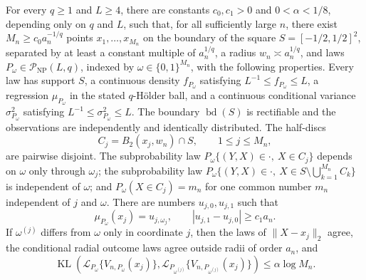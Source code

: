 For every \(q\geq1\) and \(L\geq4\), there are constants \(c_0,c_1>0\) and \(0<\alpha<1/8\), depending only on \(q\) and \(L\), such that, for all sufficiently large \(n\), there exist \(M_n\geq c_0a_n^{-1/q}\) points \(x_1,\ldots,x_{M_n}\) on the boundary of the square \(S=[-1/2,1/2]^2\), separated by at least a constant multiple of \(a_n^{1/q}\), a radius \(w_n\asymp a_n^{1/q}\), and laws \(P_\omega\in\mathcal P_{\mathrm{NP}}(L,q)\), indexed by \(\omega\in\{0,1\}^{M_n}\), with the following properties.  Every law has support \(S\), a continuous density \(f_{P_\omega}\) satisfying \(L^{-1}\leq f_{P_\omega}\leq L\), a regression \(\mu_{P_\omega}\) in the stated \(q\)-H\"older ball, and a continuous conditional variance \(\sigma^2_{P_\omega}\) satisfying \(L^{-1}\leq\sigma^2_{P_\omega}\leq L\).  The boundary \(\operatorname{bd}(S)\) is rectifiable and the observations are independently and identically distributed.  The half-discs
\[
 C_j=B_2(x_j,w_n)\cap S,\qquad 1\leq j\leq M_n,
\]
are pairwise disjoint.  The subprobability law \(P_\omega\{(Y,X)\in\cdot,\ X\in C_j\}\) depends on \(\omega\) only through \(\omega_j\); the subprobability law \(P_\omega\{(Y,X)\in\cdot,\ X\in S\setminus\bigcup_{k=1}^{M_n}C_k\}\) is independent of \(\omega\); and \(P_\omega(X\in C_j)=m_n\) for one common number \(m_n\) independent of \(j\) and \(\omega\).  There are numbers \(u_{j,0},u_{j,1}\) such that
\[
 \mu_{P_\omega}(x_j)=u_{j,\omega_j},
 \qquad |u_{j,1}-u_{j,0}|\geq c_1a_n.
\]
If \(\omega^{(j)}\) differs from \(\omega\) only in coordinate \(j\), then the laws of \(\lVert X-x_j\rVert_2\) agree, the conditional radial outcome laws agree outside radii of order \(a_n\), and
\[
 \operatorname{KL}\!\left(\mathcal L_{P_\omega}\{V_{n,P_\omega}(x_j)\},
 \mathcal L_{P_{\omega^{(j)}}}\{V_{n,P_{\omega^{(j)}}}(x_j)\}\right)
 \leq\alpha\log M_n.
\]